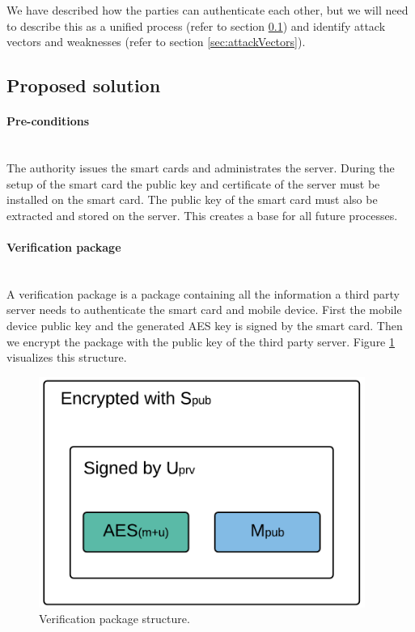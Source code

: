 We have described how the parties can authenticate each other, but we will need to describe this as a unified process (refer to section \ref{sec:proposedSolution}) and identify attack vectors and weaknesses (refer to section \ref{sec:attackVectors}).

\subsection{Proposed solution}
\label{sec:proposedSolution}

\paragraph{Pre-conditions}\mbox{}\\
The authority issues the smart cards and administrates the server. During the setup of the smart card the public key and certificate of the server must be installed on the smart card. The public key of the smart card must also be extracted and stored on the server. This creates a base for all future processes.

\paragraph{Verification package}\mbox{}\\
A verification package is a package containing all the information a third party server needs to authenticate the smart card and mobile device. First the mobile device public key and the generated AES key is signed by the smart card. Then we encrypt the package with the public key of the third party server. Figure \ref{fig:h0} visualizes this structure.

\begin{figure}[h!]
  \caption{Verification package structure.}
  \label{fig:h0}
  \centering
    \includegraphics[width=0.95\textwidth]{images/H0.png}
\end{figure}

